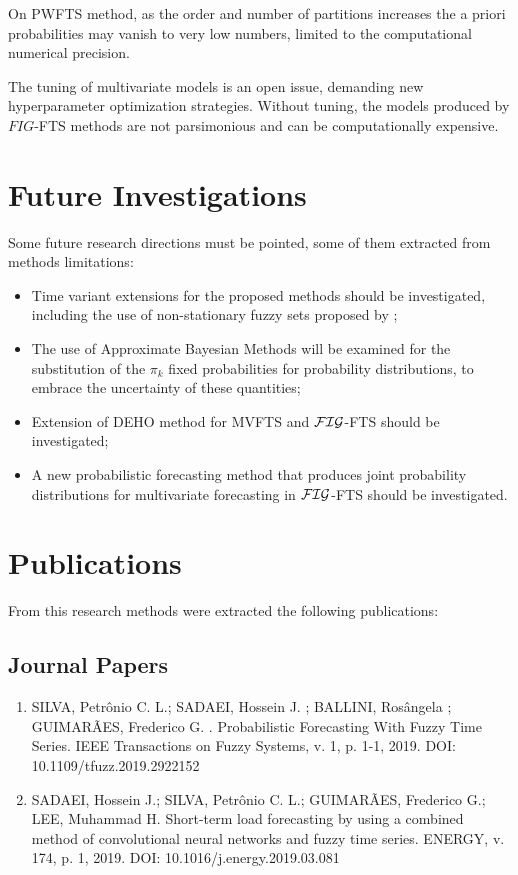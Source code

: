 On PWFTS method, as the order and number of partitions increases the a priori probabilities may vanish to very low numbers, limited to the computational numerical precision.

The tuning of multivariate models is an open issue, demanding new hyperparameter optimization strategies. Without tuning, the models produced by $FIG$-FTS methods are not parsimonious and can be computationally expensive.


\section{Future Investigations}

Some future research directions must be pointed, some of them extracted from methods limitations:

\begin{itemize}
    \item Time variant extensions for the proposed methods should be investigated, including the use of non-stationary fuzzy sets proposed by \cite{Garibaldi2008};
    \item The use of Approximate Bayesian Methods will be examined for the substitution of the $\pi_k$ fixed probabilities for probability distributions, to embrace the uncertainty of these quantities;
    \item Extension of DEHO method for MVFTS and $\mathcal{FIG}$-FTS should be investigated;
    \item A new probabilistic forecasting method that produces joint probability distributions for multivariate forecasting in $\mathcal{FIG}$-FTS should be investigated.
\end{itemize}


\section{Publications}

From this research methods were extracted the following publications:

\subsection{Journal Papers}
\begin{enumerate}
    \item SILVA, Petrônio C. L.; SADAEI, Hossein J. ; BALLINI, Rosângela ; GUIMARÃES, Frederico G. . Probabilistic Forecasting With Fuzzy Time Series. IEEE Transactions on Fuzzy Systems, v. 1, p. 1-1, 2019. DOI: 10.1109/tfuzz.2019.2922152
    \item SADAEI, Hossein J.; SILVA, Petrônio C. L.; GUIMARÃES, Frederico G.; LEE, Muhammad H. Short-term load forecasting by using a combined method of convolutional neural networks and fuzzy time series. ENERGY, v. 174, p. 1, 2019. DOI: 10.1016/j.energy.2019.03.081
\end{enumerate}

